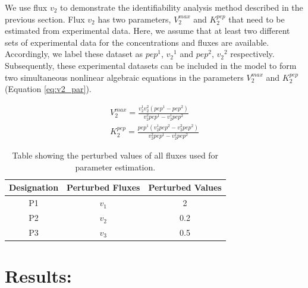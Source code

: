 \documentclass[10pt]{article}
\begin{document}
	We use flux $v_2$ to demonstrate the identifiability analysis method described in the previous section. Flux $v_2$ has two parameters, $V_2^{max}$ and $K_2^{pep}$ that need to be estimated from experimental data. Here, we assume that at least two different sets of experimental data for the concentrations and fluxes are available. Accordingly, we label these dataset as ${pep}^1$, ${v_2}^1$ and ${pep}^2$, ${v_2}^2$ respectively. Subsequently, these experimental datasets can be included in the model to form two simultaneous nonlinear algebraic equations in the parameters $V_2^{max}$ and $K_2^{pep}$ (Equation \ref{eq:v2_par}).
	
	\begin{subequations}\label{eq:v2_par}
		\begin{align}		
		V_2^{max} = \frac{v_2^1v_2^2(pep^1-pep^2)}{v_2^2pep^1-v_2^1pep^2}\\
		K_2^{pep} = \frac{pep^1(v_2^1pep^2-v_2^2pep^2)}{v_2^2pep^1-v_2^1pep^2}
		\end{align}
	\end{subequations}
	
	\begin{table}[!tbhp]
		\caption{Table showing the perturbed values of all fluxes used for parameter estimation.}
		\begin{center}				
			\begin{tabular}{ccc}
				Designation & Perturbed Fluxes & Perturbed Values\\
				\hline
				P1 & $v_1$ & 2\\
				P2 & $v_2$ & 0.2\\
				P3 & $v_3$ & 0.5
			\end{tabular}
		\end{center}	
		\label{tab:pval}
	\end{table}

	\section{Results:}

	
	\printbibliography
\end{document}
